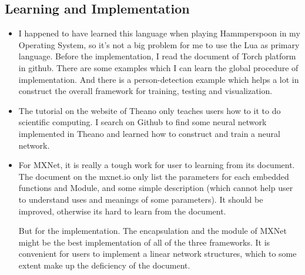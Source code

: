 \documentclass[12pt]{article}
\begin{document}
\subsection{Learning and Implementation}
\begin{itemize}
	\item  I happened to have learned this language when playing Hammperspoon in my Operating System, so it’s not a big problem for me to use the Lua as primary language. Before the implementation, I read the document of Torch platform in github. There are some examples which I can learn the global procedure of implementation. And there is a person-detection example which helps a lot in construct the overall framework for training, testing and visualization. 
	\item The tutorial on the website of Theano only teaches users how to it to do scientific computing. I search on Github to find some neural network implemented in Theano and learned how to construct and train a neural network.

	\item For MXNet, it is really a tough work for user to learning from its document. The document on the mxnet.io only list the parameters for each embedded functions and Module, and some simple description (which cannot help user to understand uses and meanings of some parameters). It should be improved, otherwise its hard to learn from the document.
		
		But for the implementation. The encapsulation and the module of MXNet might be the best implementation of all of the three frameworks. It is convenient for users to implement a linear network structures, which to some extent make up the deficiency of the document.
\end{itemize}
\end{document}
